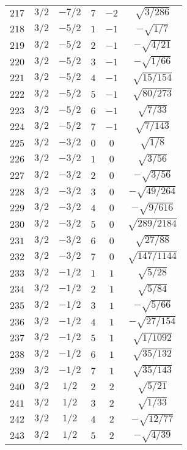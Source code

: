 \begin{table}
\begin{center}
\begin{tabular}{|c|c|c|c|c|c|}
$217$ & $3/2$ & $-7/2$ & $7$ & $-2$ & $\sqrt{3/286}$ \\ 
$218$ & $3/2$ & $-5/2$ & $1$ & $-1$ & $-\sqrt{1/7}$ \\ 
$219$ & $3/2$ & $-5/2$ & $2$ & $-1$ & $-\sqrt{4/21}$ \\ 
$220$ & $3/2$ & $-5/2$ & $3$ & $-1$ & $-\sqrt{1/66}$ \\ 
$221$ & $3/2$ & $-5/2$ & $4$ & $-1$ & $\sqrt{15/154}$ \\ 
$222$ & $3/2$ & $-5/2$ & $5$ & $-1$ & $\sqrt{80/273}$ \\ 
$223$ & $3/2$ & $-5/2$ & $6$ & $-1$ & $\sqrt{7/33}$ \\ 
$224$ & $3/2$ & $-5/2$ & $7$ & $-1$ & $\sqrt{7/143}$ \\ 
$225$ & $3/2$ & $-3/2$ & $0$ & $0$ & $\sqrt{1/8}$ \\ 
$226$ & $3/2$ & $-3/2$ & $1$ & $0$ & $\sqrt{3/56}$ \\ 
$227$ & $3/2$ & $-3/2$ & $2$ & $0$ & $-\sqrt{3/56}$ \\ 
$228$ & $3/2$ & $-3/2$ & $3$ & $0$ & $-\sqrt{49/264}$ \\ 
$229$ & $3/2$ & $-3/2$ & $4$ & $0$ & $-\sqrt{9/616}$ \\ 
$230$ & $3/2$ & $-3/2$ & $5$ & $0$ & $\sqrt{289/2184}$ \\ 
$231$ & $3/2$ & $-3/2$ & $6$ & $0$ & $\sqrt{27/88}$ \\ 
$232$ & $3/2$ & $-3/2$ & $7$ & $0$ & $\sqrt{147/1144}$ \\ 
$233$ & $3/2$ & $-1/2$ & $1$ & $1$ & $\sqrt{5/28}$ \\ 
$234$ & $3/2$ & $-1/2$ & $2$ & $1$ & $\sqrt{5/84}$ \\ 
$235$ & $3/2$ & $-1/2$ & $3$ & $1$ & $-\sqrt{5/66}$ \\ 
$236$ & $3/2$ & $-1/2$ & $4$ & $1$ & $-\sqrt{27/154}$ \\ 
$237$ & $3/2$ & $-1/2$ & $5$ & $1$ & $\sqrt{1/1092}$ \\ 
$238$ & $3/2$ & $-1/2$ & $6$ & $1$ & $\sqrt{35/132}$ \\ 
$239$ & $3/2$ & $-1/2$ & $7$ & $1$ & $\sqrt{35/143}$ \\ 
$240$ & $3/2$ & $1/2$ & $2$ & $2$ & $\sqrt{5/21}$ \\ 
$241$ & $3/2$ & $1/2$ & $3$ & $2$ & $\sqrt{1/33}$ \\ 
$242$ & $3/2$ & $1/2$ & $4$ & $2$ & $-\sqrt{12/77}$ \\ 
$243$ & $3/2$ & $1/2$ & $5$ & $2$ & $-\sqrt{4/39}$ \\ 

\end{tabular}
\end{center}
\end{table}
